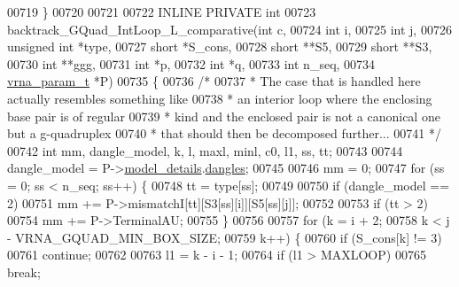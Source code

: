 \begin{DoxyCode}
00719 \}
00720 
00721 
00722 INLINE PRIVATE \textcolor{keywordtype}{int}
00723 backtrack\_GQuad\_IntLoop\_L\_comparative(\textcolor{keywordtype}{int}           c,
00724                                       \textcolor{keywordtype}{int}           i,
00725                                       \textcolor{keywordtype}{int}           j,
00726                                       \textcolor{keywordtype}{unsigned} \textcolor{keywordtype}{int}  *type,
00727                                       \textcolor{keywordtype}{short}         *S\_cons,
00728                                       \textcolor{keywordtype}{short}         **S5,
00729                                       \textcolor{keywordtype}{short}         **S3,
00730                                       \textcolor{keywordtype}{int}           **ggg,
00731                                       \textcolor{keywordtype}{int}           *p,
00732                                       \textcolor{keywordtype}{int}           *q,
00733                                       \textcolor{keywordtype}{int}           n\_seq,
00734                                       \hyperlink{group__energy__parameters_structvrna__param__s}{vrna\_param\_t}  *P)
00735 \{
00736   \textcolor{comment}{/*}
00737 \textcolor{comment}{   * The case that is handled here actually resembles something like}
00738 \textcolor{comment}{   * an interior loop where the enclosing base pair is of regular}
00739 \textcolor{comment}{   * kind and the enclosed pair is not a canonical one but a g-quadruplex}
00740 \textcolor{comment}{   * that should then be decomposed further...}
00741 \textcolor{comment}{   */}
00742   \textcolor{keywordtype}{int} mm, dangle\_model, k, l, maxl, minl, c0, l1, ss, tt;
00743 
00744   dangle\_model = P->\hyperlink{group__energy__parameters_a7b84353eb9075c595bad4ceb871bcae7}{model\_details}.\hyperlink{group__model__details_adcda4ff2ea77748ae0e8700288282efc}{dangles};
00745 
00746   mm = 0;
00747   \textcolor{keywordflow}{for} (ss = 0; ss < n\_seq; ss++) \{
00748     tt = type[ss];
00749 
00750     \textcolor{keywordflow}{if} (dangle\_model == 2)
00751       mm += P->mismatchI[tt][S3[ss][i]][S5[ss][j]];
00752 
00753     \textcolor{keywordflow}{if} (tt > 2)
00754       mm += P->TerminalAU;
00755   \}
00756 
00757   \textcolor{keywordflow}{for} (k = i + 2;
00758        k < j - VRNA\_GQUAD\_MIN\_BOX\_SIZE;
00759        k++) \{
00760     \textcolor{keywordflow}{if} (S\_cons[k] != 3)
00761       \textcolor{keywordflow}{continue};
00762 
00763     l1 = k - i - 1;
00764     \textcolor{keywordflow}{if} (l1 > MAXLOOP)
00765       \textcolor{keywordflow}{break};

\end{DoxyCode}
